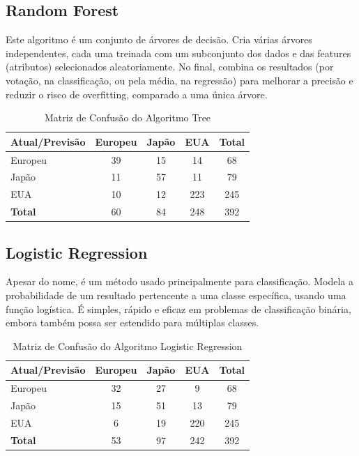\documentclass[conference]{IEEEtran}
\begin{document}
\subsection{Random Forest}
Este algoritmo é um conjunto de árvores de decisão. Cria várias árvores independentes, cada uma treinada com 
um subconjunto dos dados e das features (atributos) selecionados aleatoriamente. No final, combina os resultados 
(por votação, na classificação, ou pela média, na regressão) para melhorar a precisão e reduzir o risco de overfitting, 
comparado a uma única árvore.
\begin{table}[!ht]
    \centering
    \begin{tabular}{lcccc}
    \toprule
    \textbf{Atual/Previsão} & \textbf{Europeu} & \textbf{Japão} & \textbf{EUA} & \textbf{Total} \\
    \midrule
    Europeu & 39 & 15 & 14 & 68 \\
    Japão  & 11 & 57 & 11 & 79 \\
    EUA    & 10 & 12 & 223 & 245 \\
    \midrule
    \textbf{Total} & 60 & 84 & 248 & 392 \\
    \bottomrule
    \end{tabular}
    \label{tab:conf_matrix_forest}
    \caption{Matriz de Confusão do Algoritmo Tree}
\end{table}

\subsection{Logistic Regression}
Apesar do nome, é um método usado principalmente para classificação. Modela a probabilidade de um resultado pertencente a 
uma classe específica, usando uma função logística. É simples, rápido e eficaz em problemas de classificação binária, 
embora também possa ser estendido para múltiplas classes.
\begin{table}[!ht]
    \centering
    \begin{tabular}{lcccc}
    \toprule
    \textbf{Atual/Previsão} & \textbf{Europeu} & \textbf{Japão} & \textbf{EUA} & \textbf{Total} \\
    \midrule
    Europeu & 32 & 27 & 9 & 68 \\
    Japão  & 15 & 51 & 13 & 79 \\
    EUA    & 6 & 19 & 220 & 245 \\
    \midrule
    \textbf{Total} & 53 & 97 & 242 & 392 \\
    \bottomrule
    \end{tabular}
    \label{tab:conf_matrix_logistic}
    \caption{Matriz de Confusão do Algoritmo Logistic Regression}
\end{table}
\end{document}
